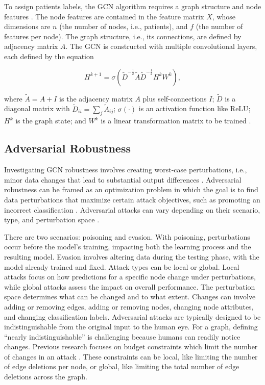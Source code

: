 \documentclass[unnumsec,webpdf,modern,large]{oup-authoring-template}
\theoremstyle{thmstyleone}%
\theoremstyle{thmstyletwo}%
\theoremstyle{thmstylethree}%
\begin{document}
To assign patients labels, the GCN algorithm requires a graph structure and node features \cite{kipf2016semi}. The node features are contained in the feature matrix $X$, whose dimensions are $n$ (the number of nodes, i.e., patients), and $f$ (the number of features per node). The graph structure, i.e., its connections, are defined by adjacency matrix $A$. The GCN is constructed with multiple convolutional layers, each defined by the equation

\begin{equation}
    H^{k+1} = \sigma\left(\tilde{D}^{-\frac{1}{2}} \tilde{A} \tilde{D}^{-\frac{1}{2}} H^k W^k\right),
\end{equation}

where $\tilde{A} = A + I$ is the adjacency matrix $A$ plus self-connections $I$; $\tilde{D}$ is a diagonal matrix with $\tilde{D}_{ii} = \sum_j\tilde{A}_{ij}$; $\sigma(\cdot)$ is an activation function like ReLU; $H^k$ is the graph state; and $W^k$ is a linear transformation matrix to be trained \cite{tang2022graph}.

\subsection{Adversarial Robustness}

\par Investigating GCN robustness involves creating worst-case perturbations, i.e., minor data changes that lead to substantial output differences \cite{zugner2018adversarial}. Adversarial robustness can be framed as an optimization problem in which the goal is to find data perturbations that maximize certain attack objectives, such as promoting an incorrect classification \cite{Günnemann2022}. Adversarial attacks can vary depending on their scenario, type, and perturbation space \cite{Günnemann2022}. 

\par There are two scenarios: poisoning and evasion. With poisoning, perturbations occur before the model's training, impacting both the learning process and the resulting model. Evasion involves altering data during the testing phase, with the model already trained and fixed. Attack types can be local or global. Local attacks focus on how predictions for a specific node change under perturbations, while global attacks assess the impact on overall performance. The perturbation space determines what can be changed and to what extent. Changes can involve adding or removing edges, adding or removing nodes, changing node attributes, and changing classification labels. Adversarial attacks are typically designed to be indistinguishable from the original input to the human eye. For a graph, defining “nearly indistinguishable” is challenging because humans can readily notice changes. Previous research focuses on budget constraints which limit the number of changes in an attack \cite{ma2020towards, zugner2020adversarial}. These constraints can be local, like limiting the number of edge deletions per node, or global, like limiting the total number of edge deletions across the graph.
\end{document}
